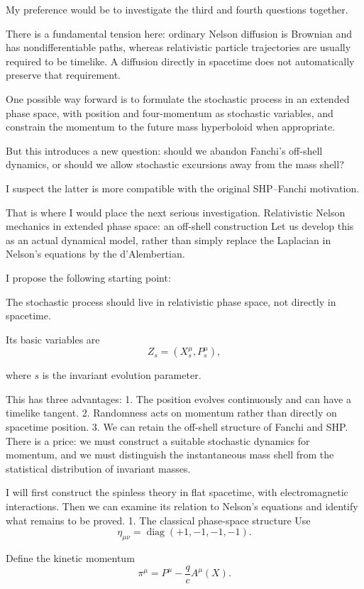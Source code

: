 My preference would be to investigate the third and fourth questions together.

There is a fundamental tension here: ordinary Nelson diffusion is Brownian and has nondifferentiable paths, whereas relativistic particle trajectories are usually required to be timelike. A diffusion directly in spacetime does not automatically preserve that requirement.

One possible way forward is to formulate the stochastic process in an extended phase space, with position and four-momentum as stochastic variables, and constrain the momentum to the future mass hyperboloid when appropriate.

But this introduces a new question: should we abandon Fanchi's off-shell dynamics, or should we allow stochastic excursions away from the mass shell?

I suspect the latter is more compatible with the original SHP–Fanchi motivation.

That is where I would place the next serious investigation.
Relativistic Nelson mechanics in extended phase space: an off-shell construction
Let us develop this as an actual dynamical model, rather than simply replace the Laplacian in Nelson's equations by the d'Alembertian.

I propose the following starting point:

The stochastic process should live in relativistic phase space, not directly in spacetime.

Its basic variables are
\[
Z_s=(X_s^\mu,P_s^\mu),
\]

where \(s\) is the invariant evolution parameter.

This has three advantages:
1. The position evolves continuously and can have a timelike tangent.
2. Randomness acts on momentum rather than directly on spacetime position.
3. We can retain the off-shell structure of Fanchi and SHP.
There is a price: we must construct a suitable stochastic dynamics for momentum, and we must distinguish the instantaneous mass shell from the statistical distribution of invariant masses.

I will first construct the spinless theory in flat spacetime, with electromagnetic interactions. Then we can examine its relation to Nelson's equations and identify what remains to be proved.
1. The classical phase-space structure
Use
\[
\eta_{\mu\nu}=\operatorname{diag}(+1,-1,-1,-1).
\]

Define the kinetic momentum
\[
\pi^\mu=P^\mu-\frac qc A^\mu(X).
\]

